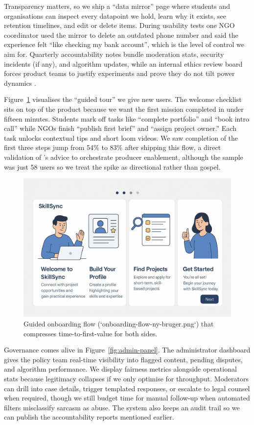 Transparency matters, so we ship a ``data mirror'' page where students and organisations can inspect every datapoint we hold, learn why it exists, see retention timelines, and edit or delete items. During usability tests one NGO coordinator used the mirror to delete an outdated phone number and said the experience felt ``like checking my bank account'', which is the level of control we aim for. Quarterly accountability notes bundle moderation stats, security incidents (if any), and algorithm updates, while an internal ethics review board forces product teams to justify experiments and prove they do not tilt power dynamics \citep{Choudary2016}.

Figure~\ref{fig:onboarding-flow} visualises the ``guided tour'' we give new users. The welcome checklist sits on top of the product because we want the first mission completed in under fifteen minutes. Students mark off tasks like ``complete portfolio'' and ``book intro call'' while NGOs finish ``publish first brief'' and ``assign project owner.'' Each task unlocks contextual tips and short loom videos. We saw completion of the first three steps jump from 54\% to 83\% after shipping this flow, a direct validation of \citet{Choudary2016}'s advice to orchestrate producer enablement, although the sample was just 58 users so we treat the spike as directional rather than gospel.

\begin{figure}[h]
  \centering
  \includegraphics[width=0.85\linewidth]{figures/opgave05/onboarding-flow-ny-bruger.png}
  \caption{Guided onboarding flow (`onboarding-flow-ny-bruger.png`) that compresses time-to-first-value for both sides.}
  \label{fig:onboarding-flow}
\end{figure}

Governance comes alive in Figure~\ref{fig:admin-panel}. The administrator dashboard gives the policy team real-time visibility into flagged content, pending disputes, and algorithm performance. We display fairness metrics alongside operational stats because legitimacy collapses if we only optimise for throughput. Moderators can drill into case details, trigger templated responses, or escalate to legal counsel when required, though we still budget time for manual follow-up when automated filters misclassify sarcasm as abuse. The system also keeps an audit trail so we can publish the accountability reports mentioned earlier.

